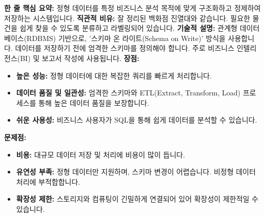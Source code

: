 \documentclass[11pt,a4paper]{article}
\begin{document}
\begin{tcolorbox}[title=\textbf{데이터 웨어하우스 (Data Warehouse)}, colback=purple!5!white, colframe=purple!75!black, sharp corners, boxrule=0.8pt]
\textbf{한 줄 핵심 요약:} 정형 데이터를 특정 비즈니스 분석 목적에 맞게 구조화하고 정제하여 저장하는 시스템입니다.
\textbf{직관적 비유:} 잘 정리된 백화점 진열대와 같습니다. 필요한 물건을 쉽게 찾을 수 있도록 분류하고 라벨링되어 있습니다.
\textbf{기술적 설명:} 관계형 데이터베이스(RDBMS) 기반으로, '스키마 온 라이트(Schema on Write)' 방식을 사용합니다. 데이터를 저장하기 전에 엄격한 스키마를 정의해야 합니다. 주로 비즈니스 인텔리전스(BI) 및 보고서 작성에 사용됩니다.
\textbf{장점:}
\begin{itemize}
    \item \textbf{높은 성능:} 정형 데이터에 대한 복잡한 쿼리를 빠르게 처리합니다.
    \item \textbf{데이터 품질 및 일관성:} 엄격한 스키마와 ETL(Extract, Transform, Load) 프로세스를 통해 높은 데이터 품질을 보장합니다.
    \item \textbf{쉬운 사용성:} 비즈니스 사용자가 SQL을 통해 쉽게 데이터를 분석할 수 있습니다.
\end{itemize}
\textbf{문제점:}
\begin{itemize}
    \item \textbf{비용:} 대규모 데이터 저장 및 처리에 비용이 많이 듭니다.
    \item \textbf{유연성 부족:} 정형 데이터만 지원하며, 스키마 변경이 어렵습니다. 비정형 데이터 처리에 부적합합니다.
    \item \textbf{확장성 제한:} 스토리지와 컴퓨팅이 긴밀하게 연결되어 있어 확장성이 제한적일 수 있습니다.
\end{itemize}
\end{tcolorbox}
\end{document}
